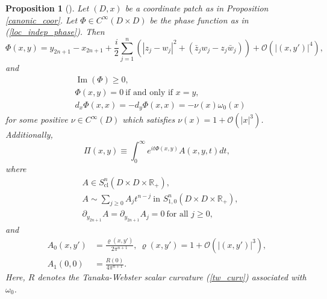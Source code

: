 \documentclass{article}
\newtheorem{proposition}[theorem]{Proposition}
\newcommand{\RR}{\mathbb R}
\newcommand{\mco}{\mathcal O}
\DeclareMathOperator{\im}{Im}
\DeclareMathOperator{\cl}{cl}
\begin{document}
%
%
\begin{proposition}[\cite{hsiao_shen}]\label{hsiao_shen_indep} Let $(D,x)$ be a coordinate patch as in Proposition \ref{canonic_coor}. Let $\Phi \in C^\infty(D \times D)$ be the phase function as in (\ref{loc_indep_phase}).
%
Then $$\Phi(x,y) = y_{2n+1}-x_{2n+1} + \frac i 2 \sum_{j=1}^n \left(|z_j - w_j|^2 + (\bar z_j w_j - z_j \bar w_j) \right) + \mco(|(x,y')|^4),$$
and \begin{equation}\label{generalized_phi_props}\begin{aligned} & \im(\Phi) \ge 0,\\ & \Phi(x,y) = 0 \ \text{if and only if }x=y,\\ & d_x\Phi(x,x) = - d_y \Phi(x,x) = -\nu(x)\omega_0(x)\end{aligned}\end{equation}
for some positive $\nu \in C^\infty(D)$ which satisfies $\nu(x) = 1 + \mco(|x|^3)$. Additionally, $$\Pi(x,y) \equiv \int_0^\infty e^{it \Phi(x,y)} A(x,y,t)dt,$$
where $$\begin{aligned} &A \in S^n_{\cl}(D \times D \times \RR_+),\\ &A\sim \sum_{j \ge 0} A_j t^{n-j}\ \text{in } S^n_{1,0}(D \times D \times \RR_+),\\ &\partial_{y_{2n+1}} A = \partial_{y_{2n+1}} A_j = 0\ \text{for all }j \ge 0,\end{aligned}$$ and $$\begin{aligned} A_0(x,y') &= \frac {\varrho(x,y')} {2\pi^{n+1}},\ \varrho(x,y') = 1 + \mco(|(x,y')|^3),\\ A_1(0,0) &= \frac{R(0)}{4\pi^{n+1}}.\end{aligned}$$ Here, $R$ denotes the Tanaka-Webster scalar curvature (\ref{tw_curv}) associated with $\omega_0$.\end{proposition}
%
%
\end{document}
